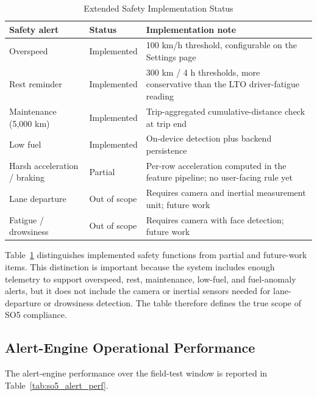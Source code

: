 \begin{table}[!htbp]
\centering
\caption{Extended Safety Implementation Status}
\label{tab:so5_safety_status}
\scriptsize
\begin{tabular}{|p{}|p{}|p{}|}
\hline
\textbf{Safety alert} & \textbf{Status} & \textbf{Implementation note} \\
\hline
Overspeed & Implemented & 100 km/h threshold, configurable on the Settings page \\
\hline
Rest reminder & Implemented & 300 km / 4 h thresholds, more conservative than the LTO driver-fatigue reading \\
\hline
Maintenance (5{,}000 km) & Implemented & Trip-aggregated cumulative-distance check at trip end \\
\hline
Low fuel & Implemented & On-device detection plus backend persistence \\
\hline
Harsh acceleration / braking & Partial & Per-row acceleration computed in the feature pipeline; no user-facing rule yet \\
\hline
Lane departure & Out of scope & Requires camera and inertial measurement unit; future work \\
\hline
Fatigue / drowsiness & Out of scope & Requires camera with face detection; future work \\
\hline
\end{tabular}
\normalsize
\end{table}

\noindent
Table~\ref{tab:so5_safety_status} distinguishes implemented safety functions from partial and future-work items. This distinction is important because the system includes enough telemetry to support overspeed, rest, maintenance, low-fuel, and fuel-anomaly alerts, but it does not include the camera or inertial sensors needed for lane-departure or drowsiness detection. The table therefore defines the true scope of SO5 compliance.

\subsection{Alert-Engine Operational Performance}
The alert-engine performance over the field-test window is reported in Table~\ref{tab:so5_alert_perf}.

